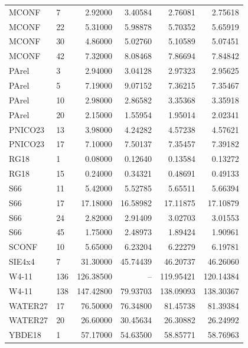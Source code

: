 {\begin{longtable}{llrrrr}
MCONF & 7 & 2.92000 & 3.40584 & 2.76081 & 2.75618 \\
MCONF & 22 & 5.31000 & 5.98878 & 5.70352 & 5.65919 \\
MCONF & 30 & 4.86000 & 5.02760 & 5.10589 & 5.07451 \\
MCONF & 42 & 7.32000 & 8.08468 & 7.86694 & 7.84842 \\
PArel & 3 & 2.94000 & 3.04128 & 2.97323 & 2.95625 \\
PArel & 5 & 7.19000 & 9.07152 & 7.36215 & 7.35467 \\
PArel & 10 & 2.98000 & 2.86582 & 3.35368 & 3.35918 \\
PArel & 20 & 2.15000 & 1.55954 & 1.95014 & 2.02341 \\
PNICO23 & 13 & 3.98000 & 4.24282 & 4.57238 & 4.57621 \\
PNICO23 & 17 & 7.10000 & 7.50137 & 7.35457 & 7.39182 \\
RG18 & 1 & 0.08000 & 0.12640 & 0.13584 & 0.13272 \\
RG18 & 15 & 0.24000 & 0.34321 & 0.48691 & 0.49133 \\
S66 & 11 & 5.42000 & 5.52785 & 5.65511 & 5.66394 \\
S66 & 17 & 17.18000 & 16.58982 & 17.11875 & 17.10879 \\
S66 & 24 & 2.82000 & 2.91409 & 3.02703 & 3.01553 \\
S66 & 45 & 1.75000 & 2.48973 & 1.89424 & 1.90961 \\
SCONF & 10 & 5.65000 & 6.23204 & 6.22279 & 6.19781 \\
SIE4x4 & 7 & 31.30000 & 45.74439 & 46.20737 & 46.26060 \\
W4-11 & 136 & 126.38500 & -- & 119.95421 & 120.14384 \\
W4-11 & 138 & 147.42800 & 79.93703 & 138.09093 & 138.30367 \\
WATER27 & 17 & 76.50000 & 76.34800 & 81.45738 & 81.39384 \\
WATER27 & 20 & 26.60000 & 30.45634 & 26.30882 & 26.24992 \\
YBDE18 & 1 & 57.17000 & 54.63500 & 58.85771 & 58.76963 \\
\bottomrule
\end{longtable}
}
